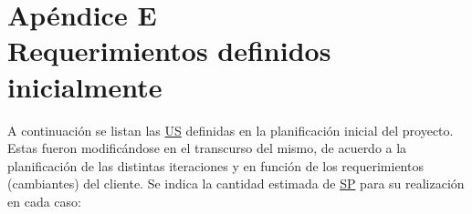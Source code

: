 \documentclass[a4paper, 12pt,twoside]{report}  %
\numberwithin{equation}{subsection} %
\begin{document}
\chapter*{\hypertarget{apendice_e}{}Apéndice E\\Requerimientos definidos inicialmente}


\label{requerimientos_definidos_inicialmente}
A continuación se listan las \hyperlink{US}{US} definidas en la planificación inicial del proyecto. Estas fueron modificándose en el transcurso del mismo, de acuerdo a la planificación de las distintas iteraciones y en función de los requerimientos (cambiantes) del cliente. Se indica la cantidad estimada de \hyperlink{SP}{SP} para su realización en cada caso:
\end{document}
